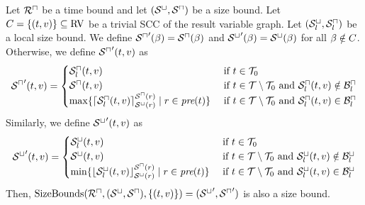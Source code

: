 \begin{theorem}
  Let ${\mathcal{R}^\sqcap}$ be a time bound and let ${({\mathcal{S}^\sqcup}, {\mathcal{S}^\sqcap})}$ be a size bound.
  Let $C = \lbrace (t,v) \rbrace \subseteq \text{RV}$ be a trivial SCC of the result variable graph.
  Let ${({\mathcal{S}^\sqcup_l}, {\mathcal{S}^\sqcap_l})}$ be a local size bound.
  We define ${\mathcal{S}^\sqcap}'(\beta) = {\mathcal{S}^\sqcap}(\beta)$ and ${\mathcal{S}^\sqcup}'(\beta) = {\mathcal{S}^\sqcup}(\beta)$ for all $\beta \notin C$.
  Otherwise, we define ${\mathcal{S}^\sqcap}'(t,v)$ as
  \[ {\mathcal{S}^\sqcap}'(t,v) =
  \begin{cases}
    {\mathcal{S}^\sqcap_l}(t, v) & \text{ if } t \in \mathcal{T}_0 \\
    {\mathcal{S}^\sqcap}(t, v) & \text{ if } t \in \mathcal{T} \setminus \mathcal{T}_0 \text{ and } {\mathcal{S}^\sqcap_l}(t,v) \notin \mathcal{B}^\sqcap_l \\
    \max \lbrace  \lceil {\mathcal{S}^\sqcap_l}(t,v) \rceil^{{\mathcal{S}^\sqcap}(r)}_{{\mathcal{S}^\sqcup}(r)} \mid r \in \emph{pre}(t) \rbrace & \text{ if } t \in \mathcal{T} \setminus \mathcal{T}_0 \text{ and } {\mathcal{S}^\sqcap_l}(t,v) \in \mathcal{B}^\sqcap_l \\
  \end{cases}
  \]
  Similarly, we define ${\mathcal{S}^\sqcup}'(t,v)$ as
  \[ {\mathcal{S}^\sqcup}'(t,v) =
  \begin{cases}
    {\mathcal{S}^\sqcup_l}(t, v) & \text{ if } t \in \mathcal{T}_0 \\
    {\mathcal{S}^\sqcup}(t, v) & \text{ if } t \in \mathcal{T} \setminus \mathcal{T}_0 \text{ and } {\mathcal{S}^\sqcup_l}(t,v) \notin \mathcal{B}^\sqcup_l \\
    \min \lbrace  \lfloor {\mathcal{S}^\sqcup_l}(t,v) \rfloor^{{\mathcal{S}^\sqcap}(r)}_{{\mathcal{S}^\sqcup}(r)} \mid r \in \emph{pre}(t) \rbrace & \text{ if } t \in \mathcal{T} \setminus \mathcal{T}_0 \text{ and } {\mathcal{S}^\sqcup_l}(t,v) \in \mathcal{B}^\sqcup_l \\
  \end{cases}
  \]
  Then, $\text{SizeBounds}({\mathcal{R}^\sqcap}, {({\mathcal{S}^\sqcup}, {\mathcal{S}^\sqcap})}, \lbrace (t,v) \rbrace) = ({\mathcal{S}^\sqcup}', {\mathcal{S}^\sqcap}')$ is also a size bound.
\end{theorem}
